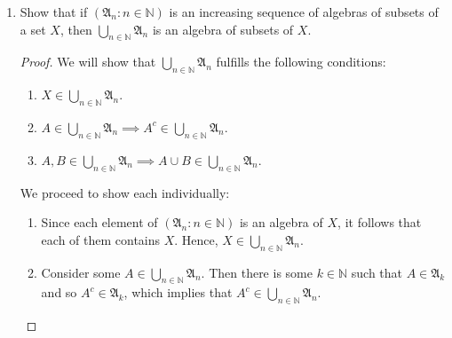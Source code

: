 \documentclass[12pt]{article}
\newcommand{\N}{\mathbb{N}}
\newenvironment{problem}[2][Problem]{\begin{trivlist}
		\item[\hskip \labelsep {\bfseries #1}\hskip \labelsep {\bfseries #2.}]}{\end{trivlist}}
\begin{document}
\begin{problem}{1.11}
	\begin{enumerate}[label=\textbf{(\alph*)}]
		\item Show that if $\left(\mathfrak{A}_{n}:n\in \N\right)$ is an increasing sequence of algebras of subsets of a set $X$, then $\bigcup_{n\in \N} \mathfrak{A}_{n}$ is an algebra of subsets of $X$.
		\begin{proof}
			We will show that $\bigcup_{n\in \N} \mathfrak{A}_{n}$ fulfills the following conditions:
			\begin{enumerate}[label=\textbf{\arabic*}]
				\item $X\in \bigcup_{n\in \N} \mathfrak{A}_{n}$.
				\item $A\in \bigcup_{n\in \N} \mathfrak{A}_{n} \implies A^{c} \in \bigcup_{n\in \N} \mathfrak{A}_{n}$.
				\item $A,B \in \bigcup_{n\in \N} \mathfrak{A}_{n} \implies A\cup B \in \bigcup_{n\in \N} \mathfrak{A}_{n}$.
			\end{enumerate}
		We proceed to show each individually:
		\begin{enumerate}[label=\textbf{\arabic*}]
			\item Since each element of $\left(\mathfrak{A}_{n}:n\in \N\right)$ is an  algebra of $X$, it follows that each of them contains $X$. Hence, $X\in \bigcup_{n\in \N} \mathfrak{A}_{n}$.
			
			\item Consider some $A\in \bigcup_{n\in \N} \mathfrak{A}_{n}$. Then there is some $k\in \N$ such that $A\in \mathfrak{A}_{k}$ and so $A^{c} \in \mathfrak{A}_{k}$, which implies that $A^{c} \in \bigcup_{n\in \N} \mathfrak{A}_{n}$.
			

\end{enumerate}
\end{proof}
\end{enumerate}
\end{problem}
\end{document}
